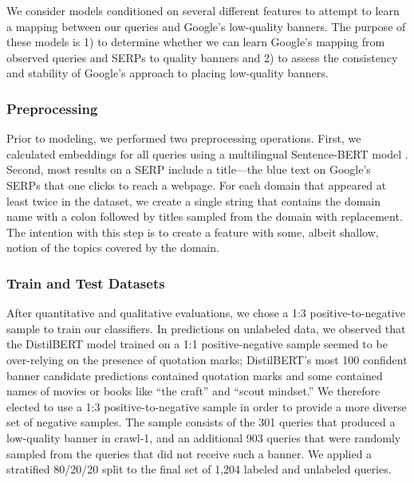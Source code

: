 {We consider models conditioned on several different features to attempt to learn a mapping between our queries and Google's low-quality banners. 
The purpose of these models is 1) to determine whether we can learn Google's mapping from observed queries and SERPs to quality banners and 2) to assess the consistency and stability of Google's approach to placing low-quality banners. 

\subsubsection{Preprocessing}
\label{sec:methods-models-preprocessing}
Prior to modeling, we performed two preprocessing operations. 
First, we calculated embeddings for all queries using a multilingual Sentence-BERT model \citep{reimers-2019-sentence-bert}. 
Second, most results on a SERP include a title---the blue text on Google's SERPs that one clicks to reach a webpage. 
For each domain that appeared at least twice in the dataset, we create a single string that contains the domain name with a colon followed by titles sampled from the domain with replacement. 
The intention with this step is to create a feature with some, albeit shallow, notion of the topics covered by the domain. 

\subsubsection{Train and Test Datasets}
\label{sec:methods-models-dataset}
After quantitative and qualitative evaluations, we chose a 1:3 positive-to-negative sample to train our classifiers.
In predictions on unlabeled data, we observed that the DistilBERT model trained on a 1:1 positive-negative sample seemed to be over-relying on the presence of quotation marks; DistilBERT's most 100 confident banner candidate predictions contained quotation marks and some contained names of movies or books like ``the craft'' and ``scout mindset.'' We therefore elected to use a 1:3 positive-to-negative sample in order to provide a more diverse set of negative samples. The sample consists of the 301 queries that produced a low-quality banner in crawl-1, and an additional 903 queries that were randomly sampled from the queries that did not receive such a banner. 
We applied a stratified 80/20/20 split to the final set of 1,204 labeled and unlabeled queries.

}
